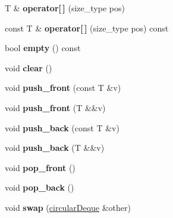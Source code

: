 \begin{DoxyCompactItemize}
\item 
\hypertarget{classcircularDeque_a501209c577d05b9600f584695301fb4f}{T \& {\bfseries operator\mbox{[}$\,$\mbox{]}} (size\+\_\+type pos)}\label{classcircularDeque_a501209c577d05b9600f584695301fb4f}

\item 
\hypertarget{classcircularDeque_a30e6ad84208bcbaba30732df01c28183}{const T \& {\bfseries operator\mbox{[}$\,$\mbox{]}} (size\+\_\+type pos) const }\label{classcircularDeque_a30e6ad84208bcbaba30732df01c28183}

\item 
\hypertarget{classcircularDeque_a2432b34cbd305c8ec71438e136da7214}{bool {\bfseries empty} () const }\label{classcircularDeque_a2432b34cbd305c8ec71438e136da7214}

\item 
\hypertarget{classcircularDeque_afa3cb2d14b6702eb5beff228d0dd2c01}{void {\bfseries clear} ()}\label{classcircularDeque_afa3cb2d14b6702eb5beff228d0dd2c01}

\item 
\hypertarget{classcircularDeque_a5de1e2619685438d18988bfe5e6e4ff7}{void {\bfseries push\+\_\+front} (const T \&v)}\label{classcircularDeque_a5de1e2619685438d18988bfe5e6e4ff7}

\item 
\hypertarget{classcircularDeque_aaf0d6018afb495e3e10b1902412ce34e}{void {\bfseries push\+\_\+front} (T \&\&v)}\label{classcircularDeque_aaf0d6018afb495e3e10b1902412ce34e}

\item 
\hypertarget{classcircularDeque_a8a532683eccb1236b6d9aebedafd1273}{void {\bfseries push\+\_\+back} (const T \&v)}\label{classcircularDeque_a8a532683eccb1236b6d9aebedafd1273}

\item 
\hypertarget{classcircularDeque_a969210491beb98fea7b64fe4ea58c5e4}{void {\bfseries push\+\_\+back} (T \&\&v)}\label{classcircularDeque_a969210491beb98fea7b64fe4ea58c5e4}

\item 
\hypertarget{classcircularDeque_a3d50aa5fb2fc0c234fda3c509b3b5a24}{void {\bfseries pop\+\_\+front} ()}\label{classcircularDeque_a3d50aa5fb2fc0c234fda3c509b3b5a24}

\item 
\hypertarget{classcircularDeque_a16851fd7ac1c4d99171b5c2a888044b6}{void {\bfseries pop\+\_\+back} ()}\label{classcircularDeque_a16851fd7ac1c4d99171b5c2a888044b6}

\item 
\hypertarget{classcircularDeque_a3c5d2c844e923a7d9e06f4ee44ed545d}{void {\bfseries swap} (\hyperlink{classcircularDeque}{circular\+Deque} \&other)}\label{classcircularDeque_a3c5d2c844e923a7d9e06f4ee44ed545d}

\end{DoxyCompactItemize}
